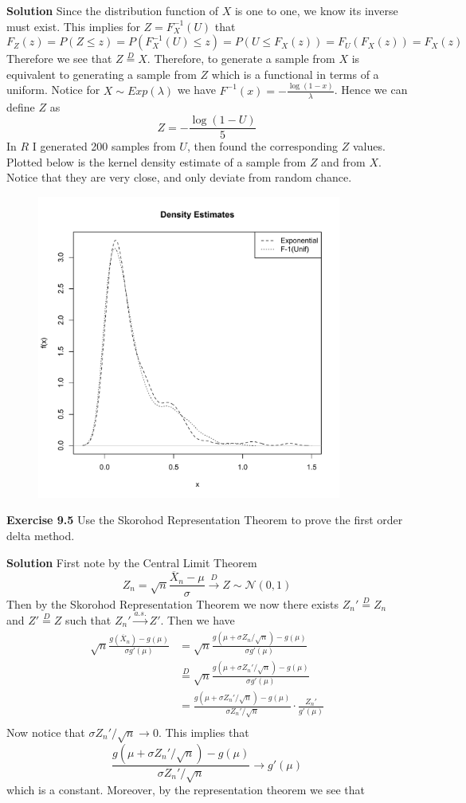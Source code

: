 \documentclass[12pt]{article}  %
\begin{document}
\textbf{Solution} Since the distribution function of $X$ is one to one, we know its inverse must exist. This implies for $Z = F_X^{-1}(U)$ that $$F_{Z}(z) = P(Z\leq z) = P(F_X^{-1}(U)\leq z) = P(U\leq F_X(z)) = F_{U}(F_X(z)) = F_X(z)$$
Therefore we see that $Z \overset{D}{=} X$. Therefore, to generate a sample from $X$ is equivalent to generating a sample from $Z$ which is a functional in terms of a uniform. Notice for $X\sim Exp(\lambda)$ we have $F^{-1}(x) = -\frac{\log(1-x)}{\lambda}$. Hence we can define $Z$ as $$Z = -\frac{\log(1 - U)}{5}$$ In $R$ I generated 200 samples from $U$, then found the corresponding $Z$ values. Plotted below is the kernel density estimate of a sample from $Z$ and from $X$. Notice that they are very close, and only deviate from random chance. 

\begin{figure}[h]
\centering
\includegraphics[width=10cm]{p1.pdf}
\end{figure}

\newpage 

\textbf{Exercise 9.5} Use the Skorohod Representation Theorem to prove the first order delta method. 

\textbf{Solution} First note by the Central Limit Theorem $$Z_n = \sqrt{n}\frac{\overline{X}_n - \mu}{\sigma}\overset{D}{\to}Z\sim \mathcal{N}(0,1)$$ 
Then by the Skorohod Representation Theorem we now there exists $Z_n'\overset{D}{=}Z_n$ and $Z' \overset{D}{=}Z$ such that $Z_n'\overset{a.s.}{\to} Z'$. Then we have 
\begin{align*}
\sqrt{n}\frac{g(\overline{X}_n) - g(\mu)}{\sigma g'(\mu)} &= \sqrt{n}\frac{g(\mu + \sigma Z_n/\sqrt{n}) - g(\mu)}{\sigma g'(\mu)}\\
&\overset{D}{=} \sqrt{n}\frac{g(\mu + \sigma Z_n'/\sqrt{n}) - g(\mu)}{\sigma g'(\mu)}\\
&= \frac{g(\mu + \sigma Z_n'/\sqrt{n}) - g(\mu)}{\sigma Z_n'/\sqrt{n}}\cdot\frac{Z_n'}{g'(\mu)}\\
\end{align*}
Now notice that $\sigma Z_n'/\sqrt{n} \to 0$. This implies that $$\frac{g(\mu + \sigma Z_n'/\sqrt{n}) - g(\mu)}{\sigma Z_n'/\sqrt{n}} \to g'(\mu)$$ which is a constant. Moreover, by the representation theorem we see that 
\end{document}
